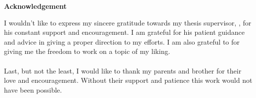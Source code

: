 \begin{center}
	{\huge{\textbf{Acknowledgement}}}
\end{center}
I wouldn't like to express my sincere gratitude towards my thesis supervisor, {\advisormain}, for his constant support and encouragement. I am grateful for his patient guidance and advice in giving a proper direction to my efforts. I am also grateful to {\advisorsec} for giving me the freedom to work on a topic of my liking.

\paragraph*{}
Last, but not the least, I would like to thank my parents and brother for their love and encouragement. Without their support and patience this work would not have been possible. 

\vskip 4mm
\begin{flushright}
\textit{\textbf{\author}}
\end{flushright}




